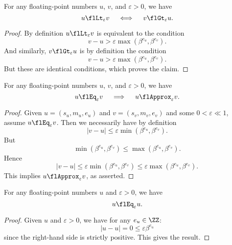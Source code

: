\begin{thm}
  For any floating-point numbers $u$, $v$, and $\varepsilon>0$, we have
  \begin{equation*}
      u\flLt_{\varepsilon} v\quad\iff\quad v\flGt_{\varepsilon} u.
  \end{equation*}
\end{thm}
\begin{proof}
  By definition $u\flLt_{\varepsilon} v$ is equivalent to the condition
  \begin{equation}
    v - u >\varepsilon\max(\beta^{e_{u}},\beta^{e_{v}}).
  \end{equation}
  And similarly, $v\flGt_{\varepsilon} u$ is by definition the condition
  \begin{equation}
    v - u >\varepsilon\max(\beta^{e_{u}},\beta^{e_{v}}).
  \end{equation}
  But these are identical conditions, which proves the claim.
\end{proof}


\begin{thm}
  For any floating-point numbers $u$, $v$, and $\varepsilon>0$, we have
  \begin{equation*}
    u\flEq_{\varepsilon} v\quad\implies\quad u\flApprox_{\varepsilon}v.
  \end{equation*}
\end{thm}
\begin{proof}
  Given $u=(s_{u}, m_{u}, e_{u})$ and $v=(s_{v}, m_{v}, e_{v})$ and some
  $0 < \varepsilon\ll 1$, assume
  $u\flEq_{\varepsilon} v$. Then we necessarily have by definition
  \begin{equation}
    |v - u| \leq \varepsilon\min(\beta^{e_{u}}, \beta^{e_{v}}).
  \end{equation}
  But
  \begin{equation}
    \min(\beta^{e_{u}}, \beta^{e_{v}})\leq\max(\beta^{e_{u}}, \beta^{e_{v}}).
  \end{equation}
  Hence
  \begin{equation}
    |v - u| \leq \varepsilon\min(\beta^{e_{u}}, \beta^{e_{v}})\leq\varepsilon\max(\beta^{e_{u}}, \beta^{e_{v}}).
  \end{equation}
  This implies $u\flApprox_{\varepsilon}v$, as asserted.
\end{proof}


\begin{thm}
  For any floating-point numbers $u$ and $\varepsilon>0$, we have
  \begin{equation*}
    u\flEq_{\varepsilon}u.
  \end{equation*}
\end{thm}
\begin{proof}
  Given $u$ and $\varepsilon>0$, we have for any $e_{u}\in\ZZ$:
  \begin{equation}
    |u-u|=0\leq \varepsilon\beta^{e_{u}}
  \end{equation}
  since the right-hand side is strictly positive. This gives the result.
\end{proof}


